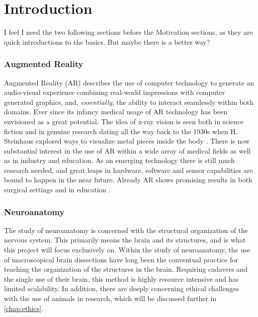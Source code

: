\chapter{Introduction}

{
    \color{BrickRed}
    I feel I need the two following sections before the Motivation sections, as they are quick introductions to the basics. But maybe there is a better way?
}

\subsection*{Augmented Reality}
Augmented Reality (AR) describes the use of computer technology to generate an audio-visual experience combining real-world impressions with computer generated graphics, and, \textit{essentially}, the ability to interact seamlessly within both domains. Ever since its infancy medical usage of AR technology has been envisioned as a great potential. The idea of x-ray vision is seen both in science fiction and in genuine research dating all the way back to the 1930s when H. Steinhaus explored ways to visualize metal pieces inside the body \citep{Sielhorst2008}. There is now substantial interest in the use of AR within a wide array of medical fields as well as in industry and education. As an emerging technology there is still much research needed, and great leaps in hardware, software and sensor capabilities are bound to happen in the near future. Already AR shows promising results in both surgical settings and in education \citep{Singh2013}.

\subsection*{Neuroanatomy}
The study of neuroanatomy is concerned with the structural organization of the nervous system. This primarily means the brain and its structures, and is what this project will focus exclusively on.
Within the study of neuroanatomy, the use of macroscopical brain dissections have long been the conventual practice for teaching the organization of the structures in the brain. Requiring cadavers and the single use of their brain, this method is highly resource intensive and has limited scalability. In addition, there are deeply concerning ethical challenges with the use of animals in research, which will be discussed further in \autoref{chap:ethics}. 


